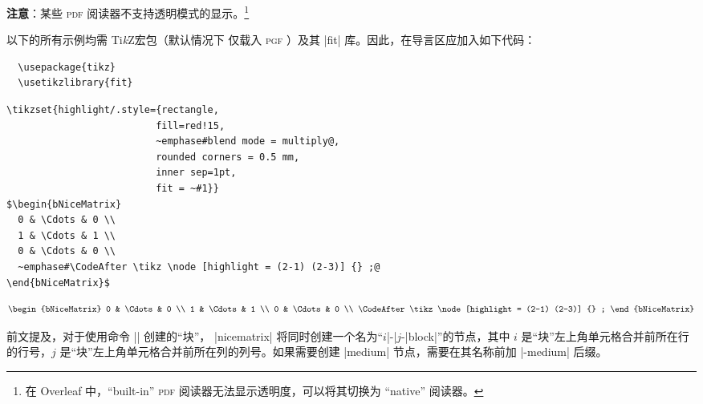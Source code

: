 \documentclass[dvipsnames]{article}%
\def\tikzname{Ti\emph{k}Z}
\begin{document}
\medskip
\textbf{注意}：某些 \textsc{pdf} 阅读器不支持透明模式的显示。\footnote{在 Overleaf 中，``built-in'' \textsc{pdf} 阅读器无法显示透明度，可以将其切换为 ``native'' 阅读器。}


\medskip
以下的所有示例均需 \tikzname 宏包（默认情况下 
仅载入 \textsc{pgf} ）及其 |fit| 库。因此，在导言区应加入如下代码：
\begin{verbatim}
  \usepackage{tikz}
  \usetikzlibrary{fit}
\end{verbatim}


\medskip
\begin{Verbatim}
\tikzset{highlight/.style={rectangle,
                          fill=red!15,
                          ~emphase#blend mode = multiply@,
                          rounded corners = 0.5 mm, 
                          inner sep=1pt,
                          fit = ~#1}}
$\begin{bNiceMatrix}
  0 & \Cdots & 0 \\
  1 & \Cdots & 1 \\
  0 & \Cdots & 0 \\
  ~emphase#\CodeAfter \tikz \node [highlight = (2-1) (2-3)] {} ;@
\end{bNiceMatrix}$
\end{Verbatim}
\[\begin{bNiceMatrix}
0 & \Cdots & 0 \\
1 & \Cdots & 1 \\
0 & \Cdots & 0 \\
\CodeAfter \tikz \node [highlight = (2-1) (2-3)] {} ; 
\end{bNiceMatrix}\]



\vspace{1cm} 
前文提及，对于使用命令 |\Block| 创建的“块”， |nicematrix| 将同时创建一个名为“$i$|-|$j$-|block|”的节点，其中 $i$ 是“块”左上角单元格合并前所在行的行号，$j$ 是“块”左上角单元格合并前所在列的列号。如果需要创建 |medium| 节点，需要在其名称前加 |-medium| 后缀。
\end{document}
